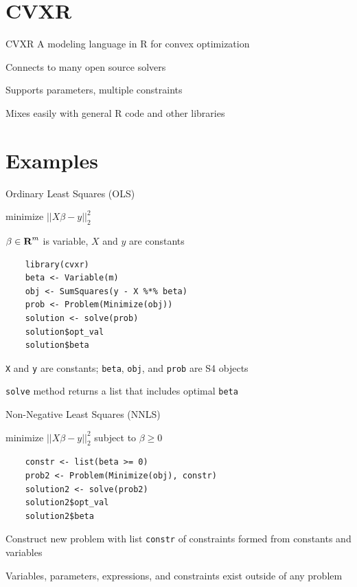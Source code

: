\documentclass{beamer}
\begin{document}
\section{CVXR}

\begin{frame}{CVXR}
	A modeling language in R for convex optimization
	
	\BIT
		\item Connects to many open source solvers
		\item Supports parameters, multiple constraints
		\item Mixes easily with general R code and other libraries
	\EIT
\end{frame}

\section{Examples}

\begin{frame}[fragile]{Ordinary Least Squares (OLS)}
	\BIT
		\item minimize $||X\beta - y||_2^2$
		\item $\beta \in {\mbox{\bf R}}^m$ is variable, $X$ and $y$ are constants
	\EIT
	
	\pause
	\begin{verbatim}
	library(cvxr)
	beta <- Variable(m)
	obj <- SumSquares(y - X %*% beta)
	prob <- Problem(Minimize(obj))
	solution <- solve(prob)
	solution$opt_val
	solution$beta
	\end{verbatim}
	
	\BIT
		\item \verb|X| and \verb|y| are constants; \verb|beta|, \verb|obj|, and \verb|prob| are S4 objects
		\item \verb|solve| method returns a list that includes optimal \verb|beta|
	\EIT
\end{frame}

\begin{frame}[fragile]{Non-Negative Least Squares (NNLS)}
	\BIT
	\item minimize $||X\beta - y||_2^2$ subject to $\beta \geq 0$
	\EIT
	\pause
	\begin{verbatim}
	constr <- list(beta >= 0)
	prob2 <- Problem(Minimize(obj), constr)
	solution2 <- solve(prob2)
	solution2$opt_val
	solution2$beta
	\end{verbatim}
	
	\BIT
		\item Construct new problem with list \verb|constr| of constraints formed from constants and variables
		\item Variables, parameters, expressions, and constraints exist outside of any problem
	\EIT
\end{frame}
\end{document}
